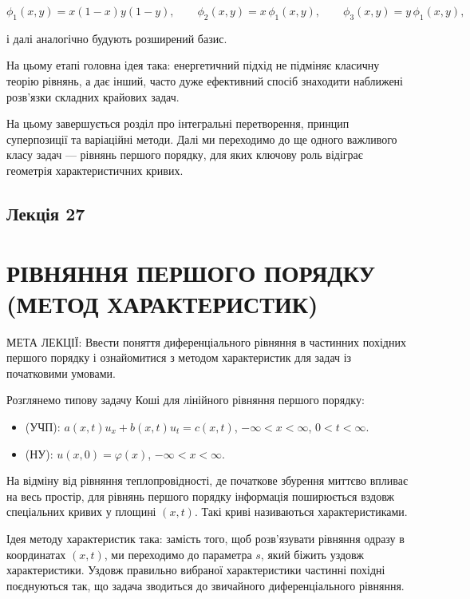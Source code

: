 \documentclass[
  ukrainian,
]{article}
\providecommand{\tightlist}{%
  \setlength{\itemsep}{0pt}\setlength{\parskip}{0pt}}
\begin{document}
\[
\phi_1(x,y) = x(1-x)y(1-y), \qquad
\phi_2(x,y) = x\,\phi_1(x,y), \qquad
\phi_3(x,y) = y\,\phi_1(x,y),
\]

і далі аналогічно будують розширений базис.

На цьому етапі головна ідея така: енергетичний підхід не підміняє
класичну теорію рівнянь, а дає інший, часто дуже ефективний спосіб
знаходити наближені розв'язки складних крайових задач.

На цьому завершується розділ про інтегральні перетворення, принцип
суперпозиції та варіаційні методи. Далі ми переходимо до ще одного
важливого класу задач --- рівнянь першого порядку, для яких ключову роль
відіграє геометрія характеристичних кривих.

\subsection{Лекція 27}\label{ux43bux435ux43aux446ux456ux44f-27}

\section{РІВНЯННЯ ПЕРШОГО ПОРЯДКУ (МЕТОД
ХАРАКТЕРИСТИК)}\label{ux440ux456ux432ux43dux44fux43dux43dux44f-ux43fux435ux440ux448ux43eux433ux43e-ux43fux43eux440ux44fux434ux43aux443-ux43cux435ux442ux43eux434-ux445ux430ux440ux430ux43aux442ux435ux440ux438ux441ux442ux438ux43a}

МЕТА ЛЕКЦІЇ: Ввести поняття диференціального рівняння в частинних
похідних першого порядку і ознайомитися з методом характеристик для
задач із початковими умовами.

Розглянемо типову задачу Коші для лінійного рівняння першого порядку:

\begin{itemize}
\tightlist
\item
  (УЧП): \(a(x,t)u_x + b(x,t)u_t = c(x,t)\), \(-\infty < x < \infty\),
  \(0 < t < \infty\).
\item
  (НУ): \(u(x,0) = \varphi(x)\), \(-\infty < x < \infty\).
\end{itemize}

На відміну від рівняння теплопровідності, де початкове збурення миттєво
впливає на весь простір, для рівнянь першого порядку інформація
поширюється вздовж спеціальних кривих у площині \((x,t)\). Такі криві
називаються характеристиками.

Ідея методу характеристик така: замість того, щоб розв'язувати рівняння
одразу в координатах \((x,t)\), ми переходимо до параметра \(s\), який
біжить уздовж характеристики. Уздовж правильно вибраної характеристики
частинні похідні поєднуються так, що задача зводиться до звичайного
диференціального рівняння.
\end{document}
